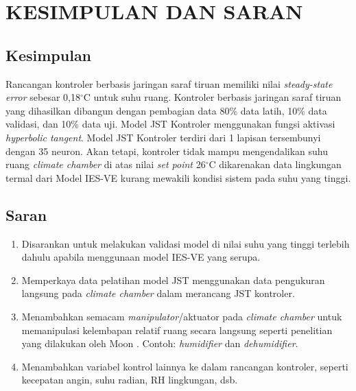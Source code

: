 \chapter{KESIMPULAN DAN SARAN}
\label{kesimpulan-dan-saran}

\section{Kesimpulan}
Rancangan kontroler berbasis jaringan saraf tiruan memiliki nilai \textit{steady-state error} sebesar 0,18$^\circ$C untuk suhu ruang. Kontroler berbasis jaringan saraf tiruan yang dihasilkan dibangun dengan pembagian data 80\% data latih, 10\% data validasi, dan 10\% data uji. Model JST Kontroler menggunakan fungsi aktivasi \textit{hyperbolic tangent}. Model JST Kontroler terdiri dari 1 lapisan tersembunyi dengan 35 neuron. Akan tetapi, kontroler tidak mampu mengendalikan suhu ruang \textit{climate chamber} di atas nilai \textit{set point} 26$^\circ$C dikarenakan data lingkungan termal dari Model IES-VE kurang mewakili kondisi sistem pada suhu yang tinggi.

\section{Saran}

\begin{enumerate}
	\item Disarankan untuk melakukan validasi model di nilai suhu yang tinggi terlebih dahulu apabila menggunaan model IES-VE yang serupa.
	\item Memperkaya data pelatihan model JST menggunakan data pengukuran langsung pada \textit{climate chamber} dalam merancang JST kontroler.
	\item Menambahkan semacam \textit{manipulator}/aktuator pada \textit{climate chamber} untuk memanipulasi kelembapan relatif ruang secara langsung seperti penelitian yang dilakukan oleh Moon \cite{paper22JJkim}. Contoh: \textit{humidifier} dan \textit{dehumidifier}.
	\item Menambahkan variabel kontrol lainnya ke dalam rancangan kontroler, seperti kecepatan angin, suhu radian, RH lingkungan, dsb.
\end{enumerate}